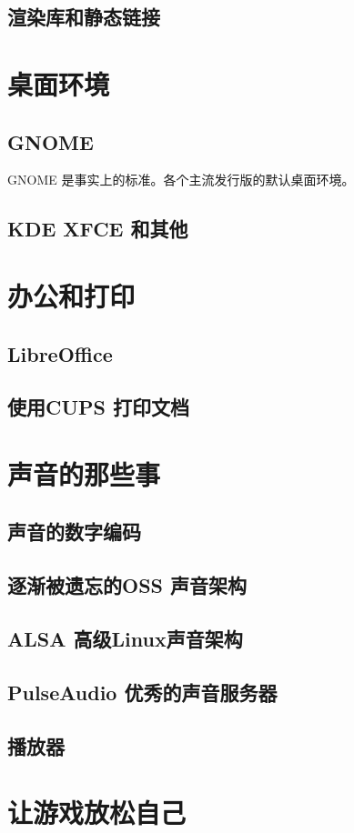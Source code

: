 \documentclass[amstex,twoside]{ctexbook}
\begin{document}
\subsection{ 渲染库和静态链接}
\section{桌面环境}
\subsection{GNOME}
GNOME 是事实上的标准。各个主流发行版的默认桌面环境。
\subsection{ KDE XFCE 和其他}

\section{  办公和打印	}
\subsection{  LibreOffice	}
\subsection{使用CUPS 打印文档	}
\section{ 声音的那些事	}
\subsection{  声音的数字编码	}
\subsection{  逐渐被遗忘的OSS	声音架构}
\subsection{ ALSA 高级Linux声音架构}
\subsection{  PulseAudio 优秀的声音服务器	}
\subsection{  播放器	}
\section{  让游戏放松自己	}
\end{document}
